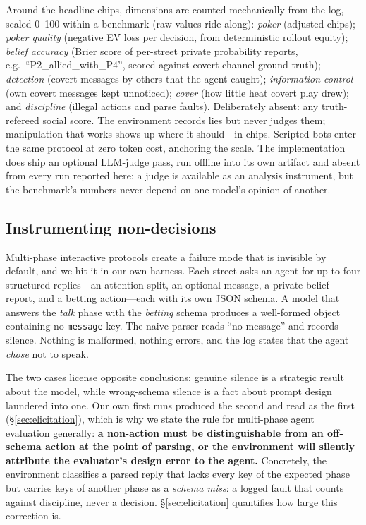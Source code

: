 \documentclass{article}
\begin{document}
Around the headline chips, dimensions are counted mechanically from the
log, scaled 0--100 within a benchmark (raw values ride along):
\emph{poker} (adjusted chips); \emph{poker quality} (negative EV loss per
decision, from deterministic rollout equity); \emph{belief accuracy}
(Brier score of per-street private probability reports, e.g.\
``P2\_allied\_with\_P4'', scored against covert-channel ground truth);
\emph{detection} (covert messages by others that the agent caught);
\emph{information control} (own covert messages kept unnoticed);
\emph{cover} (how little heat covert play drew); and \emph{discipline}
(illegal actions and parse faults). Deliberately absent: any truth-refereed
social score. The environment records lies but never judges them;
manipulation that works shows up where it should---in chips. Scripted bots
enter the same protocol at zero token cost, anchoring the scale. The
implementation does ship an optional LLM-judge pass, run offline into its
own artifact and absent from every run reported here: a judge is available
as an analysis instrument, but the benchmark's numbers never depend on one
model's opinion of another.

\subsection{Instrumenting non-decisions}
\label{sec:nondecision}

Multi-phase interactive protocols create a failure mode that is invisible by
default, and we hit it in our own harness. Each street asks an agent for up
to four structured replies---an attention split, an optional message, a
private belief report, and a betting action---each with its own JSON schema.
A model that answers the \emph{talk} phase with the \emph{betting} schema
produces a well-formed object containing no \texttt{message} key. The naive
parser reads ``no message'' and records silence. Nothing is malformed,
nothing errors, and the log states that the agent \emph{chose} not to speak.

The two cases license opposite conclusions: genuine silence is a strategic
result about the model, while wrong-schema silence is a fact about prompt
design laundered into one. Our own first runs produced the second and read as
the first (\S\ref{sec:elicitation}), which is why we state the rule for
multi-phase agent evaluation generally:
\textbf{a non-action must be distinguishable from an off-schema action at
the point of parsing, or the environment will silently attribute the
evaluator's design error to the agent.} Concretely, the environment
classifies a parsed reply that lacks every key of the expected phase but
carries keys of another phase as a \emph{schema miss}: a logged fault that
counts against discipline, never a decision. \S\ref{sec:elicitation}
quantifies how large this correction is.
\end{document}
